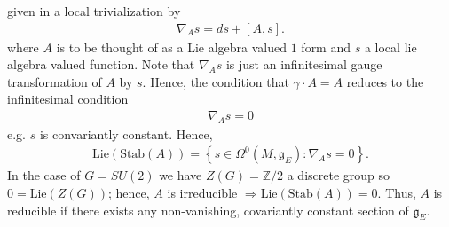 \documentclass[12pt, onecolumn]{article}
\begin{document}
given in a local trivialization by
\begin{align*}
\nabla_{A}s=ds+[A,s].
\end{align*}
where $A$ is to be thought of as a Lie algebra valued $1$ form and $s$ a local lie algebra valued function. Note that $\nabla_{A}s$ is just an infinitesimal gauge transformation of $A$ by $s$.  Hence, the condition that $\gamma \cdot A = A$ reduces to the infinitesimal condition
\begin{align*}
\nabla_{A}s =0
\end{align*}
e.g. $s$ is convariantly constant.  Hence,
\begin{align*}
\text{Lie}(\text{Stab}(A))=\left \{s \in \Omega^{0}(M,\mathfrak{g}_{E}):\nabla_{A}s=0\right\}.
\end{align*}
In the case of $G=SU(2)$ we have $Z(G)=\mathbb{Z}/2$ a discrete group so $0=\text{Lie}(Z(G))$; hence, $A$ is irreducible $\Rightarrow \text{Lie}(\text{Stab}(A))=0$.  Thus, $A$ is reducible if there exists any non-vanishing, covariantly constant section of $\mathfrak{g}_{E}$.
\end{document}
